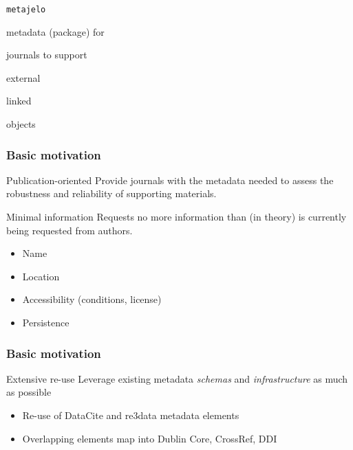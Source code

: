 \begin{frame}
\begin{center}
	\huge \texttt{metajelo}
	
	\normalsize {\color{blue} metadata} (package) for 
	
	{\color{blue}journals}  to support 
	
	\color{blue} external 
	
	linked 
	
	objects
\end{center}
\end{frame}



\begin{frame}
\frametitle{Basic motivation}
\begin{block}{Publication-oriented}
	Provide journals with the metadata needed to assess the robustness and reliability of supporting materials.
	
\end{block}

\begin{block}{Minimal information}
Requests no more information than (in theory) is currently being requested from authors.
\begin{itemize}
	\item Name
	\item Location
	\item Accessibility (conditions, license)
	\item Persistence
\end{itemize}
\end{block}
\end{frame}


\begin{frame}
\frametitle{Basic motivation}
\begin{block}{Extensive re-use}
Leverage existing metadata \textit{\color{ForestGreen} schemas} and \textit{\color{MidnightBlue} infrastructure} as much as possible
\begin{itemize}
	\item Re-use of {\color{ForestGreen} DataCite} and {\color{ForestGreen} re3data} metadata elements
	\item Overlapping elements map into Dublin Core, CrossRef, DDI
\end{itemize}
\end{block}
\end{frame}




